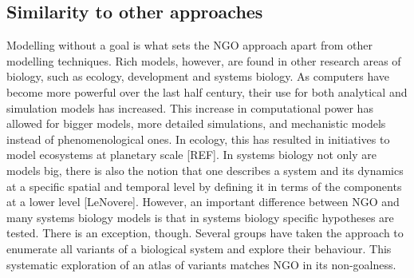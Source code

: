 \subsection{Similarity to other approaches}

Modelling without a goal is what sets the NGO approach apart from other modelling techniques. Rich models, however, are found in other research areas of biology, such as ecology, development and systems biology. As computers have become more powerful over the last half century, their use for both analytical and simulation models has increased. This increase in computational power has allowed for bigger models, more detailed simulations, and mechanistic models instead of phenomenological ones. In ecology, this has resulted in initiatives to model ecosystems at planetary scale [REF]. In systems biology not only are models big, there is also the notion that one describes a system and its dynamics at a specific spatial and temporal level by defining it in terms of the components at a lower level [LeNovere]. However, an important difference between NGO and many systems biology models is that in systems biology specific hypotheses are tested. There is an exception, though. Several groups have taken the approach to enumerate all variants of a biological system and explore their behaviour. This systematic exploration of an atlas of variants matches NGO in its non-goalness.